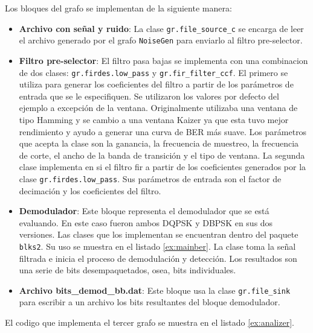 Los bloques del grafo se implementan de la siguiente manera:

\begin{itemize}
  \item \textbf{Archivo con se\~nal y ruido}: La clase \verb|gr.file_source_c| se encarga de leer el
  archivo generado por el grafo \verb|NoiseGen| para enviarlo al filtro pre-selector.
  \item \textbf{Filtro pre-selector}: El filtro pasa bajas se implementa con una combinacion de dos
  clases: \verb|gr.firdes.low_pass| y \verb|gr.fir_filter_ccf|. El primero se utiliza para generar
  los coeficientes del filtro a partir de los par\'ametros de entrada que se le especifiquen. Se
  utilizaron los valores por defecto del ejemplo a excepci\'on de la ventana. Originalmente utilizaba
  una ventana de tipo Hamming y se cambio a una ventana Kaizer ya que esta tuvo mejor rendimiento y
  ayudo a generar una curva de BER m\'as suave. Los par\'ametros que acepta la clase son la
  ganancia, la frecuencia de muestreo, la frecuencia de corte, el ancho de la banda de transici\'on
  y el tipo de ventana. La segunda clase implementa en si el filtro fir a partir de los coeficientes
  generados por la clase \verb|gr.firdes.low_pass|. Sus par\'ametros de entrada son el factor de
  decimaci\'on y los coeficientes del filtro.
  \item \textbf{Demodulador}: Este bloque representa el demodulador que se est\'a evaluando. En este
  caso fueron ambos DQPSK y DBPSK en sus dos versiones. Las clases que los implementan se encuentran
  dentro del paquete \verb|blks2|. Su uso se muestra en el listado \ref{ex:mainber}. La clase toma
  la se\~nal filtrada e inicia el proceso de demodulaci\'on y detecci\'on. Los resultados son una serie de bits
  desempaquetados, osea, bits individuales.
  \item \textbf{Archivo bits\_demod\_bb.dat}: Este bloque usa la clase \verb|gr.file_sink| para
  escribir a un archivo los bits resultantes del bloque demodulador.
\end{itemize}

El codigo que implementa el tercer grafo se muestra en el listado \ref{ex:analizer}.

